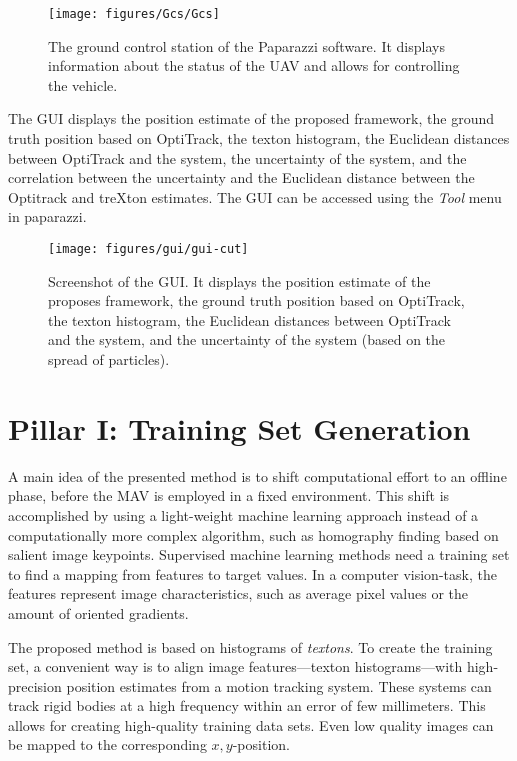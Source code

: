 \documentclass{report}
\begin{document}
\begin{figure}[h!]
\begin{center}
\texttt{[image: figures/Gcs/Gcs]}
\caption{{\label{fig:gcs} The ground control station of the Paparazzi
    software. It displays information about the status of the UAV and
    allows for controlling the vehicle.%
  }}
\end{center}
\end{figure}

The GUI displays the position estimate of the proposed framework, the
ground truth position based on OptiTrack, the texton histogram, the
Euclidean distances between OptiTrack and the system, the uncertainty
of the system, and the correlation between the uncertainty and the
Euclidean distance between the Optitrack and treXton estimates. The
GUI can be accessed using the \emph{Tool} menu in paparazzi.

\begin{figure}[h!]
\begin{center}
\texttt{[image: figures/gui/gui-cut]}
\caption{{\label{fig:gui} Screenshot of the GUI. It displays the
    position estimate of the proposes framework, the ground truth
    position based on OptiTrack, the texton histogram, the Euclidean
    distances between OptiTrack and the system, and the uncertainty of
    the system (based on the spread of particles).%
  }}
\end{center}
\end{figure}

\section{Pillar I: Training Set Generation}
\label{sec:mapping}

A main idea of the presented method is to shift computational effort
to an offline phase, before the MAV is employed in a fixed
environment. This shift is accomplished by using a light-weight
machine learning approach instead of a computationally more complex
algorithm, such as homography finding based on salient image
keypoints. Supervised machine learning methods need a training set to
find a mapping from features to target values. In a computer
vision-task, the features represent image characteristics, such as
average pixel values or the amount of oriented gradients.

The proposed method is based on histograms of \emph{textons}. To
create the training set, a convenient way is to align image
features---texton histograms---with high-precision position estimates
from a motion tracking system. These systems can track rigid bodies at
a high frequency within an error of few millimeters. This allows for
creating high-quality training data sets. Even low quality images can
be mapped to the corresponding $x,y$-position.
\end{document}

